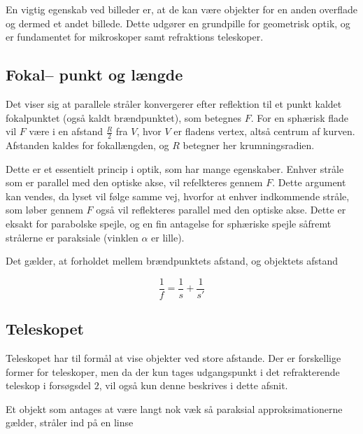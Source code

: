 En vigtig egenskab ved billeder er, at de kan være objekter for en anden overflade og dermed et andet billede. Dette udgører en grundpille for geometrisk optik, og er fundamentet for mikroskoper samt refraktions teleskoper. 


\subsection{Fokal-- punkt og længde}
Det viser sig at parallele stråler konvergerer efter reflektion til et punkt
kaldet fokalpunktet (også kaldt brændpunktet), som betegnes $F$. For en sphærisk flade vil $F$ være i en afstand $\frac{R}{2}$ fra $V$, hvor $V$ er fladens vertex, altså centrum af kurven. Afstanden kaldes for fokallængden, og $R$ betegner her krumningsradien.

Dette er et  essentielt princip i optik, som har mange egenskaber.
Enhver stråle som er parallel med den optiske akse, vil refelkteres gennem $F$. Dette argument kan vendes, da lyset vil følge samme vej, hvorfor at enhver indkommende stråle, som løber gennem $F$ også vil reflekteres parallel med den optiske akse. Dette er eksakt for parabolske spejle, og en fin antagelse for sphæriske spejle såfremt strålerne er paraksiale (vinklen $\alpha$ er lille).

Det gælder, at forholdet mellem brændpunktets afstand, og objektets afstand

\begin{equation}
    \frac{1}{f} = \frac{1}{s} + \frac{1}{s'}
    \label{eq:fokalvokal}
\end{equation}

\subsection{Teleskopet}
Teleskopet har til formål at vise objekter ved store afstande. Der er forskellige former for teleskoper, men da der kun tages udgangspunkt i det refrakterende teleskop i forsøgsdel $2$, vil også kun denne beskrives i dette afsnit.

Et objekt som antages at være langt nok væk så paraksial approksimationerne gælder, stråler ind på en linse




